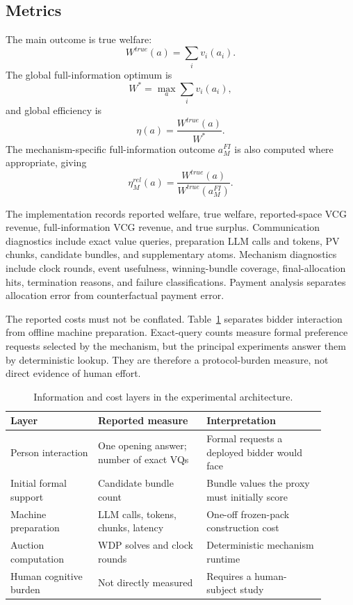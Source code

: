 \subsection{Metrics}

The main outcome is true welfare:
\[
W^{true}(a)=\sum_i v_i(a_i).
\]
The global full-information optimum is
\[
W^*=\max_a\sum_i v_i(a_i),
\]
and global efficiency is
\[
\eta(a)=\frac{W^{true}(a)}{W^*}.
\]
The mechanism-specific full-information outcome \(a_M^{FI}\) is also computed where appropriate, giving
\[
\eta_M^{rel}(a)=
\frac{W^{true}(a)}{W^{true}(a_M^{FI})}.
\]

The implementation records reported welfare, true welfare, reported-space
VCG revenue, full-information VCG revenue, and true surplus. Communication
diagnostics include exact value queries, preparation LLM calls and tokens,
PV chunks, candidate bundles, and supplementary atoms. Mechanism
diagnostics include clock rounds, event usefulness, winning-bundle coverage,
final-allocation hits, termination reasons, and failure classifications.
Payment analysis separates allocation error from counterfactual payment
error.

The reported costs must not be conflated. Table~\ref{tab:cost-layers}
separates bidder interaction from offline machine preparation. Exact-query
counts measure formal preference requests selected by the mechanism, but the
principal experiments answer them by deterministic lookup. They are therefore
a protocol-burden measure, not direct evidence of human effort.

\begin{table}[htbp]
\centering
\small
\caption{Information and cost layers in the experimental architecture.}
\label{tab:cost-layers}
\begin{tabular}{@{}p{0.25\linewidth}p{0.31\linewidth}p{0.34\linewidth}@{}}
\toprule
Layer & Reported measure & Interpretation \\
\midrule
Person interaction & One opening answer; number of exact VQs & Formal requests a deployed bidder would face \\
Initial formal support & Candidate bundle count & Bundle values the proxy must initially score \\
Machine preparation & LLM calls, tokens, chunks, latency & One-off frozen-pack construction cost \\
Auction computation & WDP solves and clock rounds & Deterministic mechanism runtime \\
Human cognitive burden & Not directly measured & Requires a human-subject study \\
\bottomrule
\end{tabular}
\end{table}

